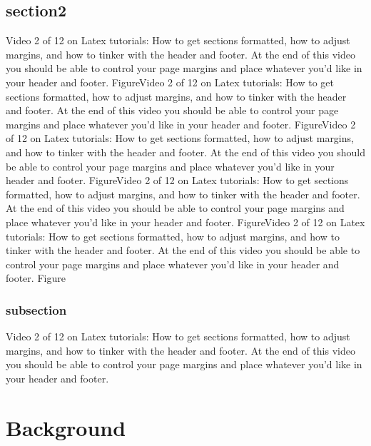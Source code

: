 \documentclass[12pt]{report}
\begin{document}
	\section{section2}
	Video 2 of 12 on Latex tutorials: How to get sections formatted, how to adjust margins, and how to tinker with the header and footer. At the end of this video you should be able to control your page margins and place whatever you'd like in your header and footer. FigureVideo 2 of 12 on Latex tutorials: How to get sections formatted, how to adjust margins, and how to tinker with the header and footer. At the end of this video you should be able to control your page margins and place whatever you'd like in your header and footer. FigureVideo 2 of 12 on Latex tutorials: How to get sections formatted, how to adjust margins, and how to tinker with the header and footer. At the end of this video you should be able to control your page margins and place whatever you'd like in your header and footer. FigureVideo 2 of 12 on Latex tutorials: How to get sections formatted, how to adjust margins, and how to tinker with the header and footer. At the end of this video you should be able to control your page margins and place whatever you'd like in your header and footer. FigureVideo 2 of 12 on Latex tutorials: How to get sections formatted, how to adjust margins, and how to tinker with the header and footer. At the end of this video you should be able to control your page margins and place whatever you'd like in your header and footer. Figure
	
	\subsection*{subsection}
	Video 2 of 12 on Latex tutorials: How to get sections formatted, how to adjust margins, and how to tinker with the header and footer. At the end of this video you should be able to control your page margins and place whatever you'd like in your header and footer.
	
	
	
	\chapter{Background}
\end{document}
